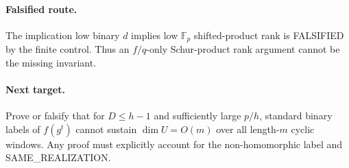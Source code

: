 \documentclass[11pt]{article}\usepackage[margin=.88in]{geometry}\usepackage{amsmath,amssymb}
\begin{document}
\paragraph{Falsified route.} The implication low binary \(d\) implies low \(\mathbb F_p\) shifted-product rank is FALSIFIED by the finite control. Thus an \(f/q\)-only Schur-product rank argument cannot be the missing invariant.
\paragraph{Next target.} Prove or falsify that for \(D\le h-1\) and sufficiently large \(p/h\), standard binary labels of \(f(g^t)\) cannot sustain \(\dim U=O(m)\) over all length-\(m\) cyclic windows. Any proof must explicitly account for the non-homomorphic label and SAME\_REALIZATION.
\end{document}
